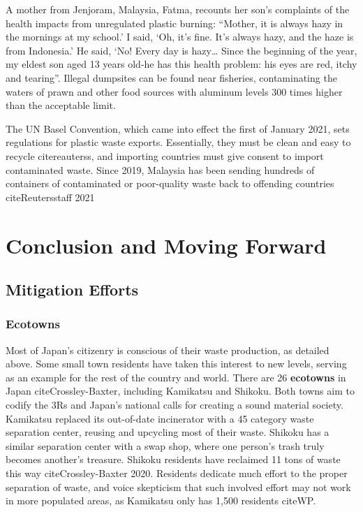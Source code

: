 \documentclass{book}\usepackage{knitr}
\begin{document}
A mother from Jenjoram, Malaysia, Fatma, recounts her son's complaints of the health impacts from unregulated plastic burning: ``Mother, it is always hazy in the mornings at my school.’ I said, ‘Oh, it’s fine. It’s always hazy, and the haze is from Indonesia.’ He said, ‘No! Every day is hazy… Since the beginning of the year, my eldest son aged 13 years old-he has this health problem: his eyes are red, itchy and tearing''. Illegal dumpsites can be found near fisheries, contaminating the waters of prawn and other food sources with aluminum levels 300 times higher than the acceptable limit. 

The UN Basel Convention, which came into effect the first of January 2021, sets regulations for plastic waste exports. Essentially, they must be clean and easy to recycle citereauterss, and importing countries must give consent to import contaminated waste. Since 2019, Malaysia has been sending hundreds of containers of contaminated or poor-quality waste back to offending countries citeReutersstaff 2021

\section{Conclusion and Moving Forward}

\subsection{Mitigation Efforts}

\subsubsection{Ecotowns}

  Most of Japan's citizenry is conscious of their waste production, as detailed above. Some small town residents have taken this interest to new levels, serving as an example for the rest of the country and world. There are 26 \textbf{ecotowns} in Japan citeCrossley-Baxter, including Kamikatsu and Shikoku. Both towns aim to codify the 3Rs and Japan's national calls for creating a sound material society. Kamikatsu replaced its out-of-date incinerator with a 45 category waste separation center, reusing and upcycling most of their waste. Shikoku has a similar separation center with a swap shop, where one person's trash truly becomes another's treasure. Shikoku residents have reclaimed 11 tons of waste this way citeCrossley-Baxter 2020. Residents dedicate much effort to the proper separation of waste, and voice skepticism that such involved effort may not work in more populated areas, as Kamikatsu only has 1,500 residents citeWP. 
\end{document}
